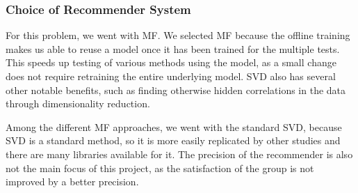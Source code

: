 \subsubsection{Choice of Recommender System}\label{sec:decision} %
For this problem, we went with MF. We selected MF because the offline training makes us able to reuse a model once it has been trained for the multiple tests. This speeds up testing of various methods using the model, as a small change does not require retraining the entire underlying model. SVD also has several other notable benefits, such as finding otherwise hidden correlations in the data through dimensionality reduction.

Among the different MF approaches, we went with the standard SVD, because SVD is a standard method, so it is more easily replicated by other studies and there are many libraries available for it. The precision of the recommender is also not the main focus of this project, as the satisfaction of the group is not improved by a better precision.